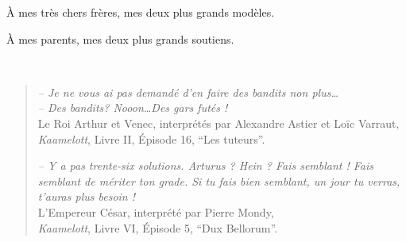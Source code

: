 
\begin{dedication}

    À mes très chers frères, mes deux plus grands modèles.

    À mes parents, mes deux plus grands soutiens.

    \textcolor{white}{À L., mon plus bel amour.}

    \vfill{}

    \hr{}


    \begin{small}
    \begin{quote}
        \emph{-- Je ne vous ai pas demandé d'en faire des \emph{bandits} non plus\dots}\\
        \emph{-- Des \emph{bandits}? Nooon\dots Des gars futés !}\\
        Le Roi Arthur et Venec,
        interprétés par Alexandre Astier et Loïc Varraut,\\
        \emph{Kaamelott}, Livre II, Épisode 16, ``Les tuteurs''.



    \vspace*{10pt}

        \emph{
            -- Y a pas trente-six solutions.
            Arturus ? Hein ? Fais semblant !
            Fais semblant de mériter ton grade.
            Si tu fais bien semblant, un jour tu verras, t'auras plus besoin !
        }\\
        L'Empereur César, interprété par Pierre Mondy,\\
        \emph{Kaamelott}, Livre VI, Épisode 5, ``Dux Bellorum''.


\end{quote}
\end{small}
\end{dedication}
